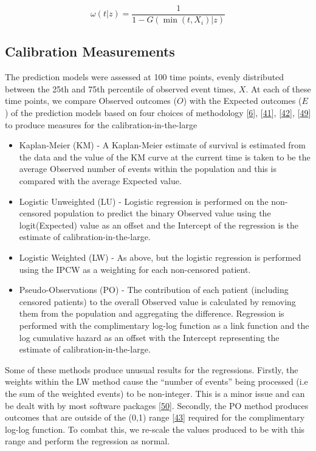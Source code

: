 \documentclass[12pt,PhD,twoside,openright]{muthesis}
\providecommand{\tightlist}{%
  \setlength{\itemsep}{0pt}\setlength{\parskip}{0pt}}
\begin{document}
\[
\omega(t|z) = \frac{1}{1 - G(\min(t,X_i)|z)}
\]

\hypertarget{calibration-measurements}{%
\subsection{Calibration Measurements}\label{calibration-measurements}}

The prediction models were assessed at 100 time points, evenly distributed between the 25th and 75th percentile of observed event times, \(X\). At each of these time points, we compare Observed outcomes (\(O\)) with the Expected outcomes (\(E\)) of the prediction models based on four choices of methodology {[}\protect\hyperlink{ref-riley_prognosis_2019}{6}{]}, {[}\protect\hyperlink{ref-royston_tools_2014}{41}{]}, {[}\protect\hyperlink{ref-royston_tools_2015}{42}{]}, {[}\protect\hyperlink{ref-andersen_pseudo-observations_2010}{49}{]} to produce measures for the calibration-in-the-large
\begin{itemize}
\tightlist
\item
  Kaplan-Meier (KM) - A Kaplan-Meier estimate of survival is estimated from the data and the value of the KM curve at the current time is taken to be the average Observed number of events within the population and this is compared with the average Expected value.
\item
  Logistic Unweighted (LU) - Logistic regression is performed on the non-censored population to predict the binary Observed value using the logit(Expected) value as an offset and the Intercept of the regression is the estimate of calibration-in-the-large.
\item
  Logistic Weighted (LW) - As above, but the logistic regression is performed using the IPCW as a weighting for each non-censored patient.
\item
  Pseudo-Observations (PO) - The contribution of each patient (including censored patients) to the overall Observed value is calculated by removing them from the population and aggregating the difference. Regression is performed with the complimentary log-log function as a link function and the log cumulative hazard as an offset with the Intercept representing the estimate of calibration-in-the-large.
\end{itemize}
Some of these methods produce unusual results for the regressions. Firstly, the weights within the LW method cause the ``number of events'' being processed (i.e the sum of the weighted events) to be non-integer. This is a minor issue and can be dealt with by most software packages {[}\protect\hyperlink{ref-wildscop_biostatistics_2013}{50}{]}. Secondly, the PO method produces outcomes that are outside of the (0,1) range {[}\protect\hyperlink{ref-perme_checking_2008}{43}{]} required for the complimentary log-log function. To combat this, we re-scale the values produced to be with this range and perform the regression as normal.
\end{document}
